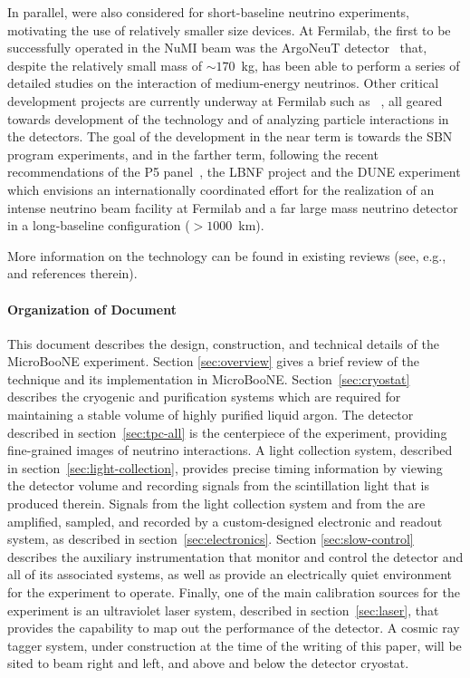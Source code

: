 In parallel, \lartpcs were also considered for short-baseline neutrino experiments, motivating the use of relatively smaller size devices.  At Fermilab, the first \lartpc to be successfully operated in the NuMI beam was the ArgoNeuT detector~\cite{Anderson:2012-argoneut} that, despite the relatively small mass of $\sim170$~kg, has been able to perform a series of detailed studies on the interaction of medium-energy neutrinos\cite{Acciarri:2013-argoneut-recomb,Anderson:2012-argoneut-CCincl,Acciarri:2014-argoneut-CCxsec,Acciarri:2014-argoneut-CCcohpi}.  Other critical development projects are currently underway at Fermilab such as ~\cite{Cavanna:2014-lariat,Szelc:2013-lariatlight,Adamowski:2014-LAPD,Rebel:2011-MTS,Montanari:2013-35ton}, all geared towards development of the technology and of analyzing particle interactions in the detectors.   The goal of the development in the near term is towards the SBN program experiments, and in the farther term, following the recent recommendations of the P5 panel~\cite{P5:2014}, the LBNF project and the DUNE experiment which envisions an internationally coordinated effort for the realization of an intense neutrino beam facility at Fermilab and a far large mass neutrino detector in a long-baseline configuration ($>1000$~km). 

More information on the \lartpc technology can be found in existing reviews (see, e.g.,~\cite{Marchionni:2013} and references therein).
 
 \paragraph{Organization of Document}

This document describes the design, construction, and technical details of the MicroBooNE experiment.  Section \ref{sec:overview} gives a brief review of the \lartpc technique and its implementation in MicroBooNE.  Section~\ref{sec:cryostat} describes the cryogenic and purification systems which are required for maintaining a stable volume of highly purified liquid argon.  The \lartpc detector described in section~\ref{sec:tpc-all} is the centerpiece of the experiment, providing fine-grained images of neutrino interactions.  A light collection system, described in section~\ref{sec:light-collection}, provides precise timing information by viewing the detector volume and recording signals from the scintillation light that is produced therein. Signals from the light collection system and from the \lartpc are amplified, sampled, and recorded by a custom-designed electronic and readout system, as described in section~\ref{sec:electronics}.  Section \ref{sec:slow-control} describes the auxiliary instrumentation that monitor and control the detector and all of its associated systems, as well as provide an electrically quiet environment for the experiment to operate. Finally, one of the main calibration sources for the experiment is an ultraviolet laser system, described in section~\ref{sec:laser}, that provides the capability to map out the performance of the \lartpc detector.  A cosmic ray tagger system, under construction at the time of the writing of this paper, will be sited to beam right and left, and above and below the detector cryostat.

